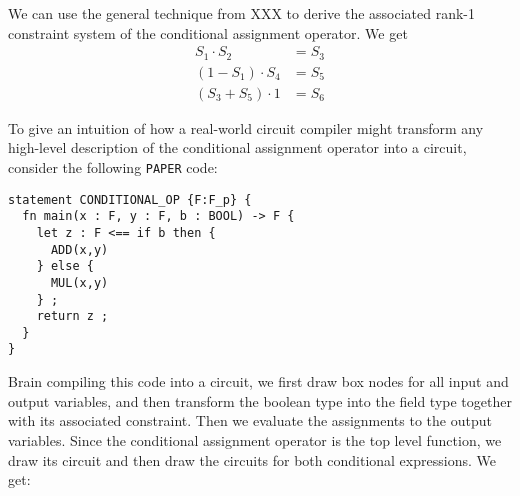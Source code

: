 We can use the general technique from XXX to derive the associated rank-1 constraint system of the conditional assignment operator. We get
\begin{align*}
S_1 \cdot S_2 & = S_3 \\
(1 - S_1) \cdot S_4 & = S_5 \\
(S_3 + S_5)\cdot 1 &= S_6
\end{align*}
\begin{example} To give an intuition of how a real-world circuit compiler might transform any high-level description of the conditional assignment operator into a circuit, consider the following \texttt{PAPER} code:
\begin{lstlisting}
statement CONDITIONAL_OP {F:F_p} {
  fn main(x : F, y : F, b : BOOL) -> F {
    let z : F <== if b then { 
      ADD(x,y) 
    } else { 
      MUL(x,y) 
    } ;
    return z ; 
  }
}
\end{lstlisting}
Brain compiling this code into a circuit, we first draw box nodes for all input and output variables, and then transform the boolean type into the field type together with its associated constraint. Then we evaluate the assignments to the output variables. Since the conditional assignment operator is the top level function, we draw its circuit and then draw the circuits for both conditional expressions. We get:
\begin{center}
\end{center}
\end{example}
